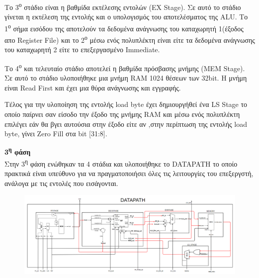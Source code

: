 \begin{justify}
    Το 3\textsuperscript{ο} στάδιο είναι η βαθμίδα εκτέλεσης
    εντολών (\textlatin{EX Stage}). Σε αυτό το στάδιο γίνεται
    η εκτέλεση της εντολής και ο υπολογισμός του αποτελέσματος της
    \textlatin{ALU}. Το 1\textsuperscript{ο} σήμα εισόδου της
    αποτελούν τα δεδομένα ανάγνωσης του καταχωρητή 1(έξοδος απο
    \textlatin{Register File}) και το 2\textsuperscript{ο}
    μέσω ενός πολυπλέκτη είναι είτε τα δεδομένα ανάγνωσης του
    καταχωρητή 2 είτε το επεξεργασμένο \textlatin{Immediate}.
\end{justify}

\begin{justify}
    Το 4\textsuperscript{ο} και τελευταίο στάδιο αποτελεί
    η βαθμίδα πρόσβασης μνήμης (\textlatin{MEM Stage}).
    Σε αυτό το στάδιο υλοποιήθηκε μια μνήμη \textlatin{RAM}
    1024 θέσεων των 32\textlatin{bit}. Η μνήμη είναι
    \textlatin{Read First} και έχει μια θύρα ανάγνωσης και εγγραφής.
\end{justify}

\begin{justify}
    Τέλος για την υλοποίηση της εντολής \textlatin{load byte}
    έχει δημιουργήθεί ένα \textlatin{LS Stage} το οποίο παίρνει
    σαν είσοδο την έξοδο της μνήμης \textlatin{RAM} και
    μέσω ενός πολυπλέκτη επιλέγει εάν θα βγει αυτούσια στην έξοδο 
    είτε αν ,στην περίπτωση της εντολής \textlatin{load byte},
    γίνει \textlatin{Zero Fill} στα \textlatin{bit} [31:8].

\end{justify}

\newpage

\begin{justify}
    \textbf{3\textsuperscript{η} φάση}\\
    Στην 3\textsuperscript{η} φάση ενώθηκαν τα 4 στάδια
    και υλοποιήθηκε το \textlatin{DATAPATH} το οποίο 
    πρακτικά είναι υπεύθυνο για να πραγματοποιήσει όλες τις
    λειτουργίες του επεξεργστή, ανάλογα με τις εντολές που 
    εισάγονται.\\
\end{justify}

\begin{figure}[h]
    \raggedright
    \hspace{-1cm}
    \includegraphics[width=1.1\textwidth]{Images/DATAPATH_Lab1.png} %
\end{figure}

